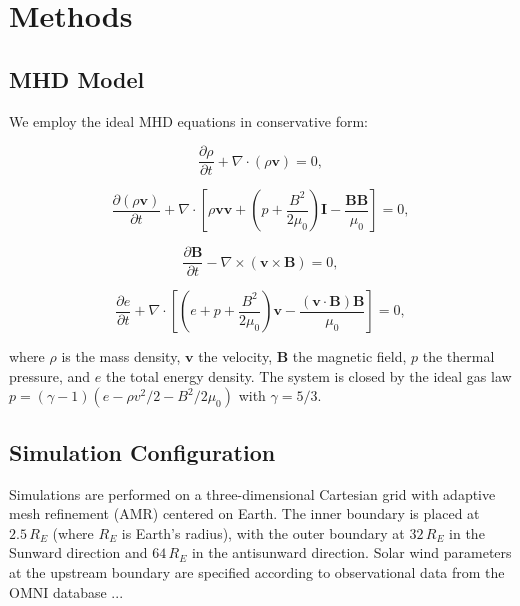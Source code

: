 \documentclass[twocolumn]{revtex4-2}
\begin{document}
\section{Methods}
\label{sec:methods}

\subsection{MHD Model}

We employ the ideal MHD equations in conservative form:

\begin{equation}
\frac{\partial \rho}{\partial t} + \nabla \cdot (\rho \mathbf{v}) = 0,
\label{eq:continuity}
\end{equation}

\begin{equation}
\frac{\partial (\rho \mathbf{v})}{\partial t} + \nabla \cdot
\left[ \rho \mathbf{v} \mathbf{v} + \left( p + \frac{B^2}{2\mu_0} \right)
\mathbf{I} - \frac{\mathbf{B} \mathbf{B}}{\mu_0} \right] = 0,
\label{eq:momentum}
\end{equation}

\begin{equation}
\frac{\partial \mathbf{B}}{\partial t} - \nabla \times
(\mathbf{v} \times \mathbf{B}) = 0,
\label{eq:induction}
\end{equation}

\begin{equation}
\frac{\partial e}{\partial t} + \nabla \cdot
\left[ \left( e + p + \frac{B^2}{2\mu_0} \right) \mathbf{v}
- \frac{(\mathbf{v} \cdot \mathbf{B}) \mathbf{B}}{\mu_0} \right] = 0,
\label{eq:energy}
\end{equation}

where $\rho$ is the mass density, $\mathbf{v}$ the velocity,
$\mathbf{B}$ the magnetic field, $p$ the thermal pressure, and $e$
the total energy density. The system is closed by the ideal gas law
$p = (\gamma - 1) (e - \rho v^2/2 - B^2/2\mu_0)$ with $\gamma = 5/3$.

\subsection{Simulation Configuration}

Simulations are performed on a three-dimensional Cartesian grid with
adaptive mesh refinement (AMR) centered on Earth. The inner boundary
is placed at $2.5\,R_E$ (where $R_E$ is Earth's radius), with the
outer boundary at $32\,R_E$ in the Sunward direction and
$64\,R_E$ in the antisunward direction. Solar wind parameters at the
upstream boundary are specified according to observational data from
the OMNI database \cite{king2005}...
\end{document}
